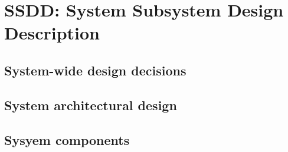 \section{SSDD: System Subsystem Design Description}

\subsection{System-wide design decisions}

\subsection{System architectural design}

\subsection{Sysyem components}
